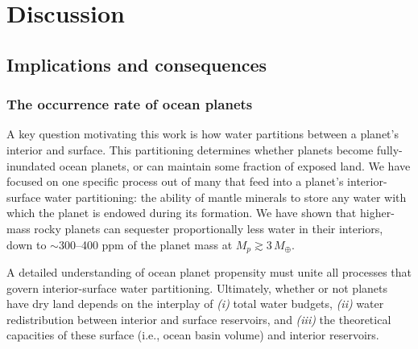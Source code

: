 \documentclass[fleqn,usenatbib]{mnras}
\begin{document}
\section{Discussion}\label{sec:discussion}

\subsection{Implications and consequences}

\subsubsection{The occurrence rate of ocean planets}\label{sec:discussion-waterworld}

A key question motivating this work is how water partitions between a planet's interior and surface. This partitioning determines whether planets become fully-inundated ocean planets, or can maintain some fraction of exposed land. We have focused on one specific process out of many that feed into a planet's interior-surface water partitioning: the ability of mantle minerals to store any water with which the planet is endowed during its formation. We have shown that higher-mass rocky planets can sequester proportionally less water in their interiors, down to $\sim$300--400 ppm of the planet mass at $M_p \gtrsim 3\,M_\oplus$.


A detailed understanding of ocean planet propensity must unite all processes that govern interior-surface water partitioning. Ultimately, whether or not planets have dry land depends on the interplay of \textit{(i)} total water budgets, \textit{(ii)} water redistribution between interior and surface reservoirs, and \textit{(iii)} the theoretical capacities of these surface (i.e., ocean basin volume) and interior reservoirs. 
\end{document}
